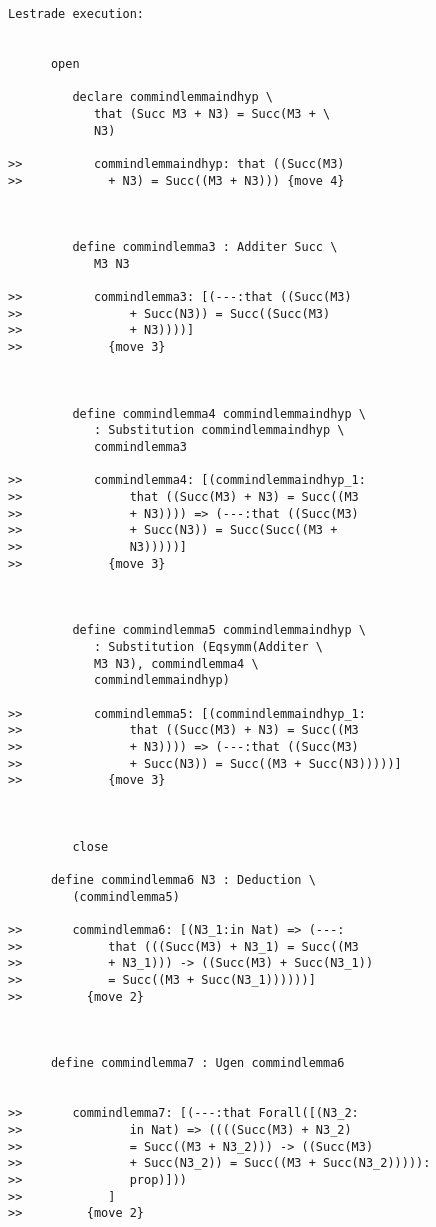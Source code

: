 \documentclass[12pt]{article}
\begin{document}
\begin{verbatim}Lestrade execution:


      open

         declare commindlemmaindhyp \
            that (Succ M3 + N3) = Succ(M3 + \
            N3)

>>          commindlemmaindhyp: that ((Succ(M3)
>>            + N3) = Succ((M3 + N3))) {move 4}



         define commindlemma3 : Additer Succ \
            M3 N3

>>          commindlemma3: [(---:that ((Succ(M3)
>>               + Succ(N3)) = Succ((Succ(M3)
>>               + N3))))]
>>            {move 3}



         define commindlemma4 commindlemmaindhyp \
            : Substitution commindlemmaindhyp \
            commindlemma3

>>          commindlemma4: [(commindlemmaindhyp_1:
>>               that ((Succ(M3) + N3) = Succ((M3
>>               + N3)))) => (---:that ((Succ(M3)
>>               + Succ(N3)) = Succ(Succ((M3 +
>>               N3)))))]
>>            {move 3}



         define commindlemma5 commindlemmaindhyp \
            : Substitution (Eqsymm(Additer \
            M3 N3), commindlemma4 \
            commindlemmaindhyp)

>>          commindlemma5: [(commindlemmaindhyp_1:
>>               that ((Succ(M3) + N3) = Succ((M3
>>               + N3)))) => (---:that ((Succ(M3)
>>               + Succ(N3)) = Succ((M3 + Succ(N3)))))]
>>            {move 3}



         close

      define commindlemma6 N3 : Deduction \
         (commindlemma5)

>>       commindlemma6: [(N3_1:in Nat) => (---:
>>            that (((Succ(M3) + N3_1) = Succ((M3
>>            + N3_1))) -> ((Succ(M3) + Succ(N3_1))
>>            = Succ((M3 + Succ(N3_1))))))]
>>         {move 2}



      define commindlemma7 : Ugen commindlemma6


>>       commindlemma7: [(---:that Forall([(N3_2:
>>               in Nat) => ((((Succ(M3) + N3_2)
>>               = Succ((M3 + N3_2))) -> ((Succ(M3)
>>               + Succ(N3_2)) = Succ((M3 + Succ(N3_2))))):
>>               prop)]))
>>            ]
>>         {move 2}




\end{verbatim}
\end{document}

